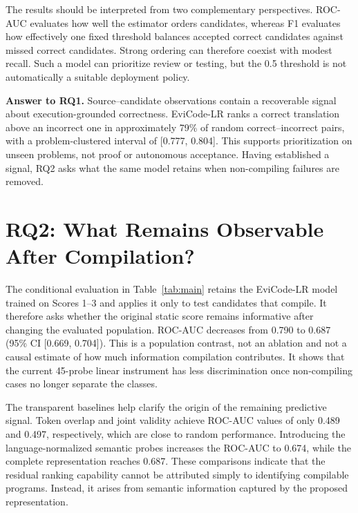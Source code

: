 \documentclass[conference]{IEEEtran}
\begin{document}
The results should be interpreted from two complementary perspectives. ROC-AUC evaluates how well the estimator orders candidates, whereas F1 evaluates how effectively one fixed threshold balances accepted correct candidates against missed correct candidates. Strong ordering can therefore coexist with modest recall. Such a model can prioritize review or testing, but the 0.5 threshold is not automatically a suitable deployment policy.

\textbf{Answer to RQ1.} Source--candidate observations contain a recoverable signal about execution-grounded correctness. EviCode-LR ranks a correct translation above an incorrect one in approximately 79\% of random correct--incorrect pairs, with a problem-clustered interval of [0.777, 0.804]. This supports prioritization on unseen problems, not proof or autonomous acceptance. Having established a signal, RQ2 asks what the same model retains when non-compiling failures are removed.

\section{RQ2: What Remains Observable After Compilation?}
\label{sec:rq2}
The conditional evaluation in Table~\ref{tab:main} retains the EviCode-LR model trained on Scores 1--3 and applies it only to test candidates that compile. It therefore asks whether the original static score remains informative after changing the evaluated population. ROC-AUC decreases from 0.790 to 0.687 (95\% CI [0.669, 0.704]). This is a population contrast, not an ablation and not a causal estimate of how much information compilation contributes. It shows that the current 45-probe linear instrument has less discrimination once non-compiling cases no longer separate the classes.

The transparent baselines help clarify the origin of the remaining predictive signal. Token overlap and joint validity achieve ROC-AUC values of only 0.489 and 0.497, respectively, which are close to random performance. Introducing the language-normalized semantic probes increases the ROC-AUC to 0.674, while the complete representation reaches 0.687. These comparisons indicate that the residual ranking capability cannot be attributed simply to identifying compilable programs. Instead, it arises from semantic information captured by the proposed representation.
\end{document}
